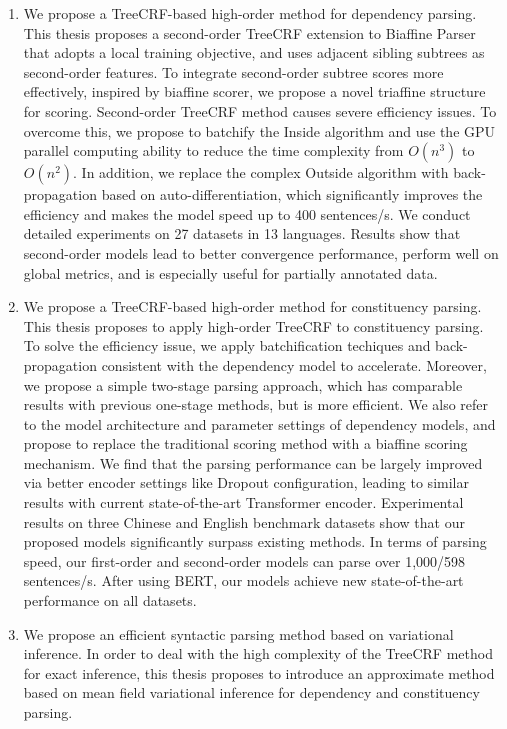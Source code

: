 \begin{eabstract}
	\begin{enumerate}
		\item We propose a TreeCRF-based high-order method for dependency parsing.
		      This thesis proposes a second-order TreeCRF extension to Biaffine Parser that adopts a local training objective, and uses adjacent sibling subtrees as second-order features.
		      To integrate second-order subtree scores more effectively, inspired by biaffine scorer, we propose a novel triaffine structure for scoring.
		      Second-order TreeCRF method causes severe efficiency issues.
		      To overcome this, we propose to batchify the Inside algorithm and use the GPU parallel computing ability to reduce the time complexity from $O(n^3)$ to $O(n^2)$.
		      In addition, we replace the complex Outside algorithm with back-propagation based on auto-differentiation, which significantly improves the efficiency and makes the model speed up to 400 sentences/s.
		      We conduct detailed experiments on 27 datasets in 13 languages.
		      Results show that second-order models lead to better convergence performance, perform well on global metrics, and is especially useful for partially annotated data.
		\item We propose a TreeCRF-based high-order method for constituency parsing.
		      This thesis proposes to apply high-order TreeCRF to constituency parsing.
		      To solve the efficiency issue, we apply batchification techiques and back-propagation consistent with the dependency model to accelerate.
		      Moreover, we propose a simple two-stage parsing approach, which has comparable results with previous one-stage methods, but is more efficient.
		      We also refer to the model architecture and parameter settings of dependency models, and propose to replace the traditional scoring method with a biaffine scoring mechanism.
		      We find that the parsing performance can be largely improved via better encoder settings like Dropout configuration, leading to similar results with current state-of-the-art Transformer encoder.
		      Experimental results on three Chinese and English benchmark datasets show that our proposed models significantly surpass existing methods.
		      In terms of parsing speed, our first-order and second-order models can parse over 1,000/598 sentences/s.
		      After using BERT, our models achieve new state-of-the-art performance on all datasets.
		\item We propose an efficient syntactic parsing method based on variational inference.
		      In order to deal with the high complexity of the TreeCRF method for exact inference, this thesis proposes to introduce an approximate method based on mean field variational inference for dependency and constituency parsing.

\end{enumerate}
\end{eabstract}
